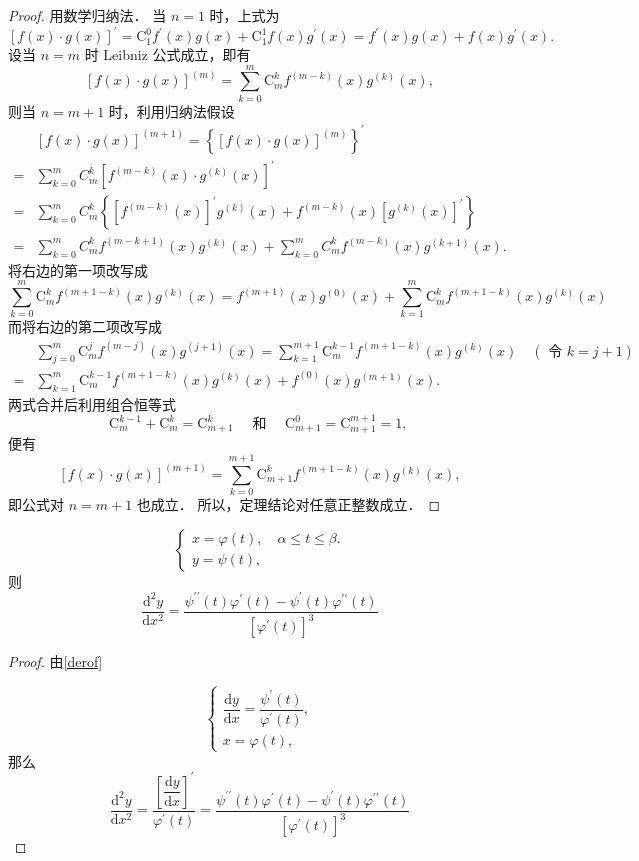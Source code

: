 \begin{proof}
	用数学归纳法．
	当 $n=1$ 时，上式为
	$$
	[f(x) \cdot g(x)]^{\prime}=\mathrm{C}_1^0 f^{\prime}(x) g(x)+\mathrm{C}_1^1 f(x) g^{\prime}(x)=f^{\prime}(x) g(x)+f(x) g^{\prime}(x) .
	$$
	设当 $n=m$ 时 Leibniz 公式成立，即有
	$$
	[f(x) \cdot g(x)]^{(m)}=\sum_{k=0}^m \mathrm{C}_m^k f^{(m-k)}(x) g^{(k)}(x),
	$$
	则当 $n=m+1$ 时，利用归纳法假设
	$$
	\begin{aligned}
		& {[f(x) \cdot g(x)]^{(m+1)}=\left\{[f(x) \cdot g(x)]^{(m)}\right\}^{\prime} } \\
		= & \sum_{k=0}^m C_m^k\left[f^{(m-k)}(x) \cdot g^{(k)}(x)\right]^{\prime} \\
		= & \sum_{k=0}^m C_m^k\left\{\left[f^{(m-k)}(x)\right]^{\prime} g^{(k)}(x)+f^{(m-k)}(x)\left[g^{(k)}(x)\right]^{\prime}\right\} \\
		= & \sum_{k=0}^m C_m^k f^{(m-k+1)}(x) g^{(k)}(x)+\sum_{k=0}^m C_m^k f^{(m-k)}(x) g^{(k+1)}(x) .
	\end{aligned}
	$$
	将右边的第一项改写成
	$$
	\sum_{k=0}^m \mathrm{C}_m^k f^{(m+1-k)}(x) g^{(k)}(x)=f^{(m+1)}(x) g^{(0)}(x)+\sum_{k=1}^m \mathrm{C}_m^k f^{(m+1-k)}(x) g^{(k)}(x)
	$$
	而将右边的第二项改写成
	$$
	\begin{aligned}
		& \sum_{j=0}^m \mathrm{C}_m^j f^{(m-j)}(x) g^{(j+1)}(x)=\sum_{k=1}^{m+1} \mathrm{C}_m^{k-1} f^{(m+1-k)}(x) g^{(k)}(x) \quad(\text { 令 } k=j+1) \\
		= & \sum_{k=1}^m \mathrm{C}_m^{k-1} f^{(m+1-k)}(x) g^{(k)}(x)+f^{(0)}(x) g^{(m+1)}(x) .
	\end{aligned}$$
	两式合并后利用组合恒等式
	$$
	\mathrm{C}_m^{k-1}+\mathrm{C}_m^k=\mathrm{C}_{m+1}^k \quad \text { 和 } \quad \mathrm{C}_{m+1}^0=\mathrm{C}_{m+1}^{m+1}=1 \text {, }
	$$
	便有$$
	[f(x) \cdot g(x)]^{(m+1)}=\sum_{k=0}^{m+1} \mathrm{C}_{m+1}^k f^{(m+1-k)}(x) g^{(k)}(x),
	$$
	即公式对 $n=m+1$ 也成立．
	所以，定理结论对任意正整数成立．
\end{proof}
\begin{proposition}
	$$\left\{\begin{array}{l}
		x=\varphi(t), \quad \alpha \leqslant t \leqslant \beta . \\
		y=\psi(t),
	\end{array}\right.$$
	则
	$$\frac{\mathrm{d}^2 y}{\mathrm{d} x^2}=\frac{\psi^{\prime \prime}(t) \varphi^{\prime}(t)-\psi^{\prime}(t) \varphi^{\prime \prime}(t)}{\left[\varphi^{\prime}(t)\right]^3}$$
\end{proposition}
\begin{proof}
	由\ref{derof}
	
	$$\left\{\begin{array}{l}
		\dfrac{\mathrm{d} y}{\mathrm{d} x}=\dfrac{ \psi^{\prime}(t)}{\varphi^{\prime}(t)}, \\
		x=\varphi(t),
	\end{array}\right.$$
	那么
	$$\frac{\mathrm{d}^2 y}{\mathrm{d} x^2}=\dfrac{\left[\dfrac{\mathrm{d} y}{\mathrm{d} x}\right]^{\prime}}{\varphi^{\prime}(t)}=\frac{\psi^{\prime \prime}(t) \varphi^{\prime}(t)-\psi^{\prime}(t) \varphi^{\prime \prime}(t)}{\left[\varphi^{\prime}(t)\right]^3}$$
\end{proof}

